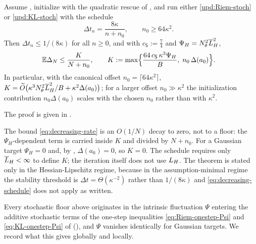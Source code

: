 \begin{theorem}
\label{thm:decreasing}
Assume , initialize with the quadratic rescue of , and run
either \eqref{upd:Riem-stoch} or \eqref{upd:KL-stoch} with the schedule
\begin{equation}
\label{eq:decreasing-schedule}
    \Delta t_n=\frac{8\kappa}{n+n_0},
    \qquad
    n_0\geq64\kappa^2 .
\end{equation}
Then $\Delta t_n\leq1/(8\kappa)$ for all $n\geq0$, and with $c_{\mathsf S}:=\tfrac74$ and
$\Psi_H=N_\theta^2\overline{L}_H^2$,
\begin{equation}
\label{eq:decreasing-rate}
    \mathbb{E}\Delta_N\leq\frac K{N+n_0},
    \qquad
    K:=\max\Bigl\{\frac{64\,c_{\mathsf S}\,\kappa^3\Psi_H}B,\;n_0\,\Delta(a_0)\Bigr\}.
\end{equation}
In particular, with the canonical offset $n_0=\lceil64\kappa^2\rceil$,
$K=\widetilde O\bigl(\kappa^3N_\theta^2\overline{L}_H^2/B+\kappa^2\Delta(a_0)\bigr)$; for a larger offset
$n_0\gg\kappa^2$ the initialization contribution $n_0\Delta(a_0)$ scales with the chosen $n_0$ rather
than with $\kappa^2$.
\end{theorem}

The proof is given in .

The bound \eqref{eq:decreasing-rate} is an $O(1/N)$ decay to zero, not to a floor: the
$\Psi_H$-dependent term is carried inside $K$ and divided by $N+n_0$. For a Gaussian target
$\Psi_H=0$ and, by , $\Delta(a_0)=0$, so $K=0$. The schedule requires only
$\overline{L}_H<\infty$ to define $K$; the iteration itself does not use $L_H$. The theorem is stated only in
the Hessian-Lipschitz regime, because in the assumption-minimal regime the stability threshold is
$\Delta t=\Theta(\kappa^{-2})$ rather than $1/(8\kappa)$ and \eqref{eq:decreasing-schedule} does not
apply as written.

Every stochastic floor above originates in the intrinsic fluctuation $\Psi$ entering the additive
stochastic terms of the one-step inequalities \eqref{eq:Riem-onestep-Psi} and \eqref{eq:KL-onestep-Psi}
of  (), and $\Psi$ vanishes
identically for Gaussian targets. We record what this gives globally and locally.

